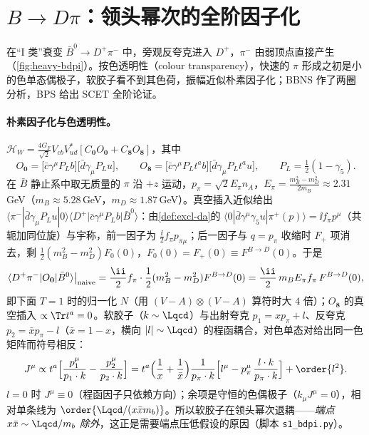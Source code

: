 \section{$B\to D\pi$：领头幂次的全阶因子化}\label{sec:heavy-bdpi}

在“I 类”衰变 $\bar B^0\to D^+\pi^-$ 中，旁观反夸克进入 $D^+$，$\pi^-$ 由弱顶点直接产生（\cref{fig:heavy-bdpi}）。按色透明性（colour transparency）\cite{Bjorken:1988kk}，快速的 $\pi$ 形成之初是小的色单态偶极子，软胶子看不到其色荷，振幅近似朴素因子化\cite{Dugan:1990de,Politzer:1991au}；BBNS 作了两圈分析\cite{BenekeEtAl2000}，BPS 给出 SCET 全阶论证\cite{BauerPirjolStewart2001}。


\paragraph{朴素因子化与色透明性。}
$\mathcal H_W=\frac{4G_F}{\sqrt2}V_{cb}V_{ud}^*[C_{\mathbf 0}O_{\mathbf 0}+C_{\mathbf 8}O_{\mathbf 8}]$，其中\cite[式~(2)]{BauerPirjolStewart2001}
\begin{equation}\label{eq:heavy-O08}
O_{\mathbf 0}=\big[\bar c\gamma^\mu P_Lb\big]\big[\bar d\gamma_\mu P_Lu\big],\qquad
O_{\mathbf 8}=\big[\bar c\gamma^\mu P_Lt^ab\big]\big[\bar d\gamma_\mu P_Lt^au\big],\qquad P_L=\tfrac12(1-\gamma_5).
\end{equation}
在 $\bar B$ 静止系中取无质量的 $\pi$ 沿 $+z$ 运动，$p_\pi=\sqrt2E_\pi n_A$，$E_\pi=\frac{m_B^2-m_D^2}{2m_B}\approx2.31$\,GeV（$m_B\approx5.28$\,GeV，$m_D\approx1.87$\,GeV\cite{ParticleDataGroup:2024cfk}）。真空插入近似给出 $\langle\pi^-|\bar d\gamma_\mu P_Lu|0\rangle\langle D^+|\bar c\gamma^\mu P_Lb|\bar B^0\rangle$：由\cref{def:excl-da}的 $\langle0|\bar d\gamma^\mu\gamma_5u|\pi^+(p)\rangle=\ii f_\pi p^\mu$（共轭加同位旋）与宇称，前一因子为 $\frac{\ii}{2}f_\pi p_{\pi\mu}$；后一因子与 $q=p_\pi$ 收缩时 $F_+$ 项消去，剩 $\frac12(m_B^2-m_D^2)F_0(0)$，$F_0(0)=F_+(0)\equiv F^{B\to D}(0)$。于是
\begin{equation}\label{eq:heavy-naive}
\langle D^+\pi^-|O_{\mathbf 0}|\bar B^0\rangle\big|_{\rm naive}=\frac{\ii}{2}f_\pi\cdot\frac12(m_B^2-m_D^2)F^{B\to D}(0)=\frac{\ii}{2}\,m_BE_\pi f_\pi\,F^{B\to D}(0),
\end{equation}
即下面 $T=1$ 时的归一化 $N$（用 $(V-A)\otimes(V-A)$ 算符时大 $4$ 倍）；$O_{\mathbf 8}$ 的真空插入 $\propto\Tr t^a=0$。软胶子（$k\sim\Lqcd$）与出射夸克 $p_1=xp_\pi+l$、反夸克 $p_2=\bar xp_\pi-l$（$\bar x=1-x$，横向 $|l|\sim\Lqcd$）的程函耦合，对色单态对给出同一色矩阵而符号相反：
\begin{equation}\label{eq:heavy-dipole}
J^\mu\propto t^a\Big[\frac{p_1^\mu}{p_1\cdot k}-\frac{p_2^\mu}{p_2\cdot k}\Big]
=t^a\Big(\frac1x+\frac1{\bar x}\Big)\frac{1}{p_\pi\cdot k}\Big[l^\mu-p_\pi^\mu\,\frac{l\cdot k}{p_\pi\cdot k}\Big]+\order{l^2}.
\end{equation}
$l=0$ 时 $J^\mu\equiv0$（程函因子只依赖方向）；余项是守恒的色偶极子（$k_\mu J^\mu=0$），相对单条线为 $\order{\Lqcd/(x\bar xm_b)}$。所以软胶子在领头幂次退耦——\emph{端点 $x\bar x\sim\Lqcd/m_b$ 除外}，这正是需要端点压低假设的原因（脚本 \texttt{s1\_\allowbreak bdpi.py}）。

